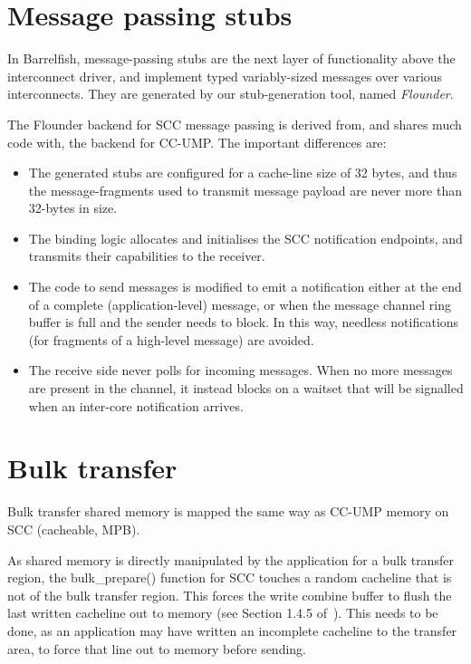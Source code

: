 \documentclass[a4paper,twoside]{report} %
\begin{document}
\section{Message passing stubs}

In Barrelfish, message-passing stubs are the next layer of functionality
above the interconnect driver, and implement typed variably-sized messages
over various interconnects. They are generated by our stub-generation tool,
named \emph{Flounder}.

The Flounder backend for SCC message passing is derived from, and shares much
code with, the backend for CC-UMP. The important differences are:

\begin{itemize}
\item The generated stubs are configured for a cache-line size of 32 bytes,
  and thus the message-fragments used to transmit message payload are never
  more than 32-bytes in size.
\item The binding logic allocates and initialises the SCC notification
  endpoints, and transmits their capabilities to the receiver.
\item The code to send messages is modified to emit a notification either at
  the end of a complete (application-level) message, or when the message
  channel ring buffer is full and the sender needs to block. In this way,
  needless notifications (for fragments of a high-level message) are avoided.
\item The receive side never polls for incoming messages. When no more messages
  are present in the channel, it instead blocks on a waitset that will be
  signalled when an inter-core notification arrives.
\end{itemize}

\section{Bulk transfer}

Bulk transfer shared memory is mapped the same way as CC-UMP
memory on SCC (cacheable, MPB).  

As shared memory is directly manipulated by the application for a bulk
transfer region, the bulk\_prepare() function for SCC touches a random
cacheline that is not of the bulk transfer region. This forces the
write combine buffer to flush the last written cacheline out to
memory (see Section 1.4.5 of~\cite{rockcreek_core_eas}). This needs
to be done, as an application may have written an incomplete cacheline
to the transfer area, to force that line out to memory before sending.
\end{document}
